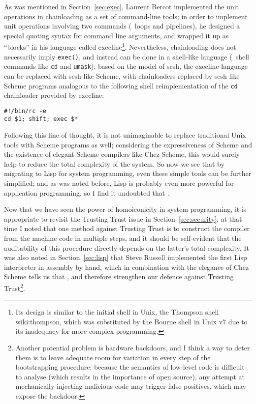 As was mentioned in Section~\ref{sec:exec}, Laurent Bercot implemented the unit
operations in chainloading as a set of command-line tools; in order to implement
unit operations involving two commands (\eg~loops and pipelines), he designed
a special quoting syntax for command line arguments, and wrapped it up as
``blocks'' in his language called execline\footnote{Its
design is similar to the initial shell in Unix, the Thompson shell\cupercite%
{wiki:thompson}, which was substituted by the Bourne shell in Unix v7 due to
its inadequacy for more complex programming.}.  Nevertheless, chainloading
does not necessarily imply \verb|exec()|, and instead can be done in a
shell-like language (\cf~shell commands like \verb|cd|
and \verb|umask|); based on the model of scsh, the execline
language can be replaced with scsh-like Scheme, with chainloaders replaced by
scsh-like Scheme programs analogous to the following shell reimplementation of
the \verb|cd| chainloader provided by execline:
\begin{wquoting}
\begin{Verbatim}
#!/bin/rc -e
cd $1; shift; exec $*
\end{Verbatim}
\end{wquoting}

Following this line of thought, it is not unimaginable to replace traditional
Unix tools with Scheme programs as well; considering the expressiveness of
Scheme and the existence of elegant Scheme compilers like Chez Scheme, this
would surely help to reduce the total complexity of the system.  So now we
see that by migrating to Lisp for system programming, even these simple
tools can be further simplified; and as was noted before, Lisp is probably
even more powerful for application programming, so I find it undoubted
that .

Now that we have seen the power of homoiconicity in system programming, it is
appropriate to revisit the Trusting Trust issue in Section~\ref{sec:security};
at that time I noted that one method against Trusting Trust is to construct the
compiler from the machine code in multiple steps, and it should be self-evident
that the auditability of this procedure directly depends on the latter's total
complexity.  It was also noted in Section~\ref{sec:lisp} that Steve Russell
implemented the first Lisp interpreter in assembly by hand, which in combination
with the elegance of Chez Scheme tells us that ,
and therefore strengthen our defence against Trusting Trust\footnote{Another
potential problem is hardware backdoors, and I think a way to deter them is to
leave adequate room for variation in every step of the bootstrapping procedure:
because the semantics of low-level code is difficult to analyse (which results
in the importance of open source), any attempt at mechanically injecting
malicious code may trigger false positives, which may expose the backdoor.}.


